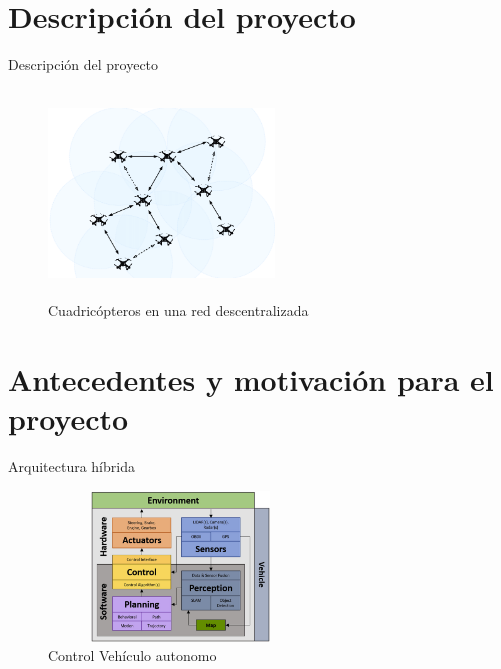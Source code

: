 \documentclass[
	11pt, %
	aspectratio=169, %
]{beamer}
\begin{document}
\section{Descripción del proyecto}
\begin{frame}{Descripción del proyecto}
  
  \begin{figure}
    \centering
    \includegraphics[width=6cm, height=5.5cm]{multiuab}
    \caption[Caption for LOF]{Cuadric\'{o}pteros en una red descentralizada\protect\footnotemark}
  \end{figure}
    
      
\end{frame}

\section{Antecedentes y motivación para el proyecto}
\begin{frame}{Arquitectura híbrida}
  \begin{figure}
    \centering
    \includegraphics[width=7cm, height=4cm]{control_autonomo2}
    \caption[Caption for LOF]{Control Vehículo autonomo\protect\footnotemark}
  \end{figure}
\end{frame}
\end{document}
